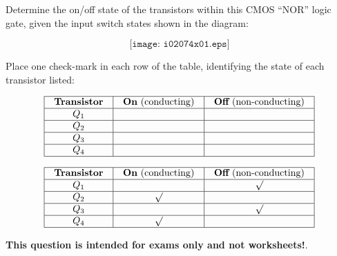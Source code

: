 

Determine the on/off state of the transistors within this CMOS ``NOR'' logic gate, given the input switch states shown in the diagram:

$$\texttt{[image: i02074x01.eps]}$$

Place one check-mark in each row of the table, identifying the state of each transistor listed:


$$\vbox{\offinterlineskip
\halign{\strut
\vrule \quad\hfil # \ \hfil & 
\vrule \quad\hfil # \ \hfil & 
\vrule \quad\hfil # \ \hfil \vrule \cr
\noalign{\hrule}
%
{\bf Transistor} & {\bf On} (conducting) & {\bf Off} (non-conducting) \cr
%
\noalign{\hrule}
%
$Q_1$ &  &  \cr
%
\noalign{\hrule}
%
$Q_2$ &  &  \cr
%
\noalign{\hrule}
%
$Q_3$ &  &  \cr
%
\noalign{\hrule}
%
$Q_4$ &  &  \cr
%
\noalign{\hrule}
} %
}$$ %








$$\vbox{\offinterlineskip
\halign{\strut
\vrule \quad\hfil # \ \hfil & 
\vrule \quad\hfil # \ \hfil & 
\vrule \quad\hfil # \ \hfil \vrule \cr
\noalign{\hrule}
%
{\bf Transistor} & {\bf On} (conducting) & {\bf Off} (non-conducting) \cr
%
\noalign{\hrule}
%
$Q_1$ &  & $\surd$ \cr
%
\noalign{\hrule}
%
$Q_2$ & $\surd$ &  \cr
%
\noalign{\hrule}
%
$Q_3$ &  & $\surd$ \cr
%
\noalign{\hrule}
%
$Q_4$ & $\surd$ &  \cr
%
\noalign{\hrule}
} %
}$$ %







{\bf This question is intended for exams only and not worksheets!}.



